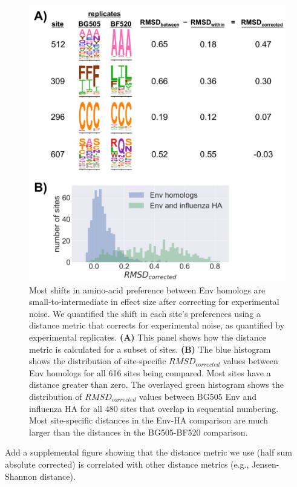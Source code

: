 \documentclass[9pt,lineno]{elife}
\begin{document}
\begin{figure}
\centerline{\includegraphics[width=4.5in]{figures/distances/distances.png}}
\caption{\label{fig:distances}
Most shifts in amino-acid preference between Env homologs are small-to-intermediate in effect size after correcting for experimental noise.
We quantified the shift in each site's preferences using a distance metric that corrects for experimental noise, as quantified by experimental replicates.
{\bf (A)} This panel shows how the distance metric is calculated for a subset of sites.
{\bf (B)} The blue histogram shows the distribution of site-specific $RMSD_{corrected}$ values between Env homologs for all 616 sites being compared.
Most sites have a distance greater than zero.
The overlayed green histogram shows the distribution of $RMSD_{corrected}$ values between BG505 Env and influenza HA for all 480 sites that overlap in sequential numbering.
Most site-specific distances in the Env-HA comparison are much larger than the distances in the BG505-BF520 comparison.
}
\end{figure}

Add a supplemental figure showing that the distance metric we use (half sum absolute corrected) is correlated with other distance metrics (e.g., Jensen-Shannon distance).
\end{document}
